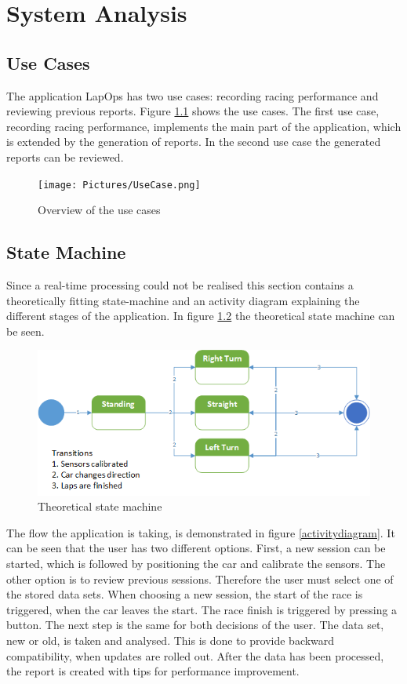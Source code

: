 \chapter{System Analysis}

\section{Use Cases}
The application LapOps has two use cases: recording racing performance and reviewing previous reports. Figure \ref{fig:usecase} shows the use cases. The first use case, recording racing performance, implements the main part of the application, which is extended by the generation of reports. In the second use case the generated reports can be reviewed. 

\begin{figure}[H]
	\centering
	\texttt{[image: Pictures/UseCase.png]}
	\caption{Overview of the use cases}
	\label{fig:usecase}
\end{figure}

\section{State Machine}
Since a real-time processing could not be realised this section contains a theoretically fitting state-machine and an activity diagram explaining the different stages of the application. In figure \ref{statemachine} the theoretical state machine can be seen.

\begin{figure}[H]
	\centering
	\includegraphics[scale=0.8]{Pictures/statemachine.png}
	\caption{Theoretical state machine}
	\label{statemachine}
\end{figure}

The flow the application is taking, is demonstrated in figure \ref{activitydiagram}. It can be seen that the user has two different options. First, a new session can be started, which is followed by positioning the car and calibrate the sensors. The other option is to review previous sessions. Therefore the user must select one of the stored data sets. When choosing a new session, the start of the race is triggered, when the car leaves the start. The race finish is triggered by pressing a button. The next step is the same for both decisions of the user. The data set, new or old, is taken and analysed. This is done to provide backward compatibility, when updates are rolled out. After the data has been processed, the report is created with tips for performance improvement.

